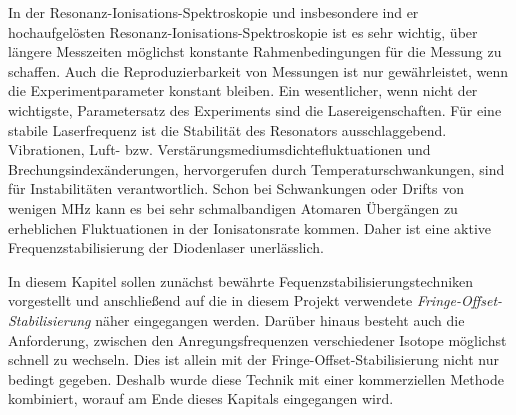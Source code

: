 In der Resonanz-Ionisations-Spektroskopie und insbesondere ind er
hochaufgelösten Resonanz-Ionisations-Spektroskopie ist es sehr wichtig, über
längere Messzeiten möglichst konstante Rahmenbedingungen für die Messung zu
schaffen. Auch die Reproduzierbarkeit von Messungen ist nur gewährleistet, wenn
die Experimentparameter konstant bleiben. Ein wesentlicher, wenn nicht der
wichtigste, Parametersatz des Experiments sind die Lasereigenschaften. Für
eine stabile Laserfrequenz ist die Stabilität des Resonators ausschlaggebend.
Vibrationen, Luft- bzw. Verstärungsmediumsdichtefluktuationen und
Brechungsindexänderungen, hervorgerufen durch Temperaturschwankungen, sind für
Instabilitäten verantwortlich. Schon bei Schwankungen oder Drifts von wenigen
MHz kann es bei sehr schmalbandigen Atomaren Übergängen zu erheblichen
Fluktuationen in der Ionisatonsrate kommen. Daher ist eine aktive
Frequenzstabilisierung der Diodenlaser unerlässlich.\par
In diesem Kapitel sollen zunächst bewährte Fequenzstabilisierungstechniken
vorgestellt und anschließend auf die in diesem Projekt verwendete
\textit{Fringe-Offset-Stabilisierung} näher eingegangen werden. Darüber hinaus
besteht auch die Anforderung, zwischen den Anregungsfrequenzen verschiedener
Isotope möglichst schnell zu wechseln. Dies ist allein mit der
Fringe-Offset-Stabilisierung nicht nur bedingt gegeben. Deshalb wurde diese
Technik mit einer kommerziellen Methode kombiniert, worauf am Ende dieses
Kapitals eingegangen wird.


